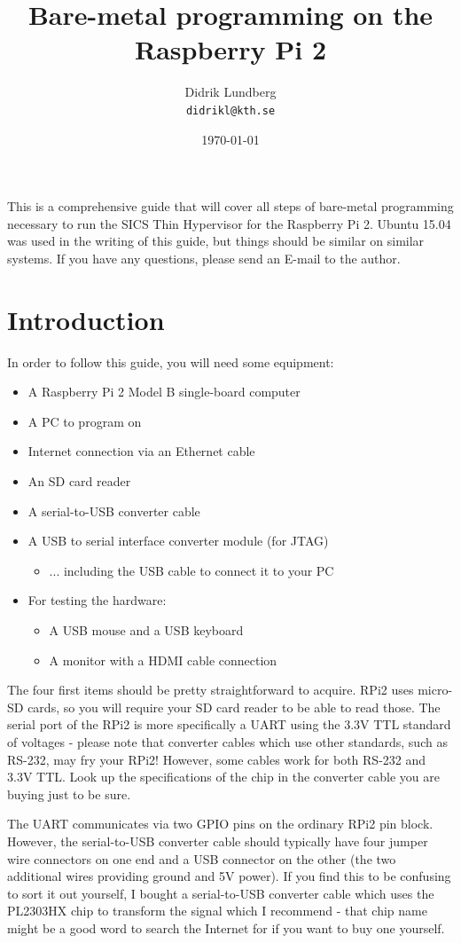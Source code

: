 \documentclass[a4paper,11pt,reqno]{amsart}
\title{Bare-metal programming on the Raspberry Pi 2}
\author{Didrik Lundberg\\
\texttt{didrikl@kth.se}}
\date{\today}
\begin{document}
\maketitle
\noindent
This is a comprehensive guide that will cover all steps of bare-metal programming necessary to run the SICS Thin Hypervisor for the Raspberry Pi 2. Ubuntu 15.04 was used in the writing of this guide, but things should be similar on similar systems. If you have any questions, please send an E-mail to the author.
\section{Introduction}
In order to follow this guide, you will need some equipment:
\begin{itemize}
  \item A Raspberry Pi 2 Model B single-board computer
  \item A PC to program on
  \item Internet connection via an Ethernet cable
  \item An SD card reader
  \item A serial-to-USB converter cable
  \item A USB to serial interface converter module (for JTAG)
   \begin{itemize}
    \item ... including the USB cable to connect it to your PC
  \end{itemize}
  \item For testing the hardware:
  \begin{itemize}
    \item A USB mouse and a USB keyboard
    \item A monitor with a HDMI cable connection
  \end{itemize}
\end{itemize}
The four first items should be pretty straightforward to acquire. RPi2 uses micro-SD cards, so you will require your SD card reader to be able to read those. The serial port of the RPi2 is more specifically a UART using the 3.3V TTL standard of voltages - please note that converter cables which use other standards, such as RS-232, may fry your RPi2! However, some cables work for both RS-232 and 3.3V TTL. Look up the specifications of the chip in the converter cable you are buying just to be sure.

The UART communicates via two GPIO pins on the ordinary RPi2 pin block. However, the serial-to-USB converter cable should typically have four jumper wire connectors on one end and a USB connector on the other (the two additional wires providing ground and 5V power). If you find this to be confusing to sort it out yourself, I bought a serial-to-USB converter cable which uses the PL2303HX chip to transform the signal which I recommend - that chip name might be a good word to search the Internet for if you want to buy one yourself.
\end{document}
